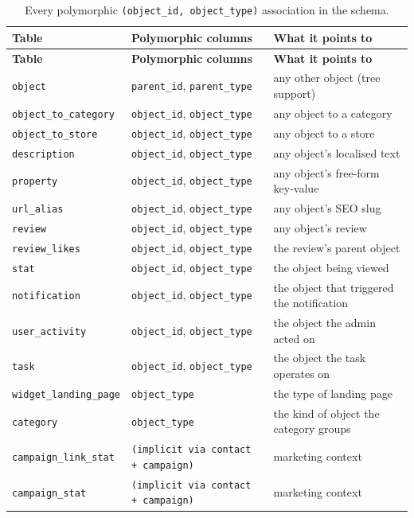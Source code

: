 \documentclass[11pt,a4paper]{article}
\begin{document}
\small
\begin{longtable}{>{\raggedright\arraybackslash}p{4.2cm}>{\raggedright\arraybackslash}p{4.4cm}>{\raggedright\arraybackslash}p{6.0cm}}
\caption{Every polymorphic \texttt{(object\_id, object\_type)} association in the schema.}\label{tab:polymorphic}\\
\toprule
\textbf{Table} & \textbf{Polymorphic columns} & \textbf{What it points to} \\
\midrule
\endfirsthead
\toprule
\textbf{Table} & \textbf{Polymorphic columns} & \textbf{What it points to} \\
\midrule
\endhead
\bottomrule
\endfoot
\texttt{object}                 & \texttt{parent\_id}, \texttt{parent\_type}             & any other object (tree support) \\
\texttt{object\_to\_category}   & \texttt{object\_id}, \texttt{object\_type}             & any object to a category \\
\texttt{object\_to\_store}      & \texttt{object\_id}, \texttt{object\_type}             & any object to a store \\
\texttt{description}            & \texttt{object\_id}, \texttt{object\_type}             & any object's localised text \\
\texttt{property}               & \texttt{object\_id}, \texttt{object\_type}             & any object's free-form key-value \\
\texttt{url\_alias}             & \texttt{object\_id}, \texttt{object\_type}             & any object's SEO slug \\
\texttt{review}                 & \texttt{object\_id}, \texttt{object\_type}             & any object's review \\
\texttt{review\_likes}          & \texttt{object\_id}, \texttt{object\_type}             & the review's parent object \\
\texttt{stat}                   & \texttt{object\_id}, \texttt{object\_type}             & the object being viewed \\
\texttt{notification}           & \texttt{object\_id}, \texttt{object\_type}             & the object that triggered the notification \\
\texttt{user\_activity}         & \texttt{object\_id}, \texttt{object\_type}             & the object the admin acted on \\
\texttt{task}                   & \texttt{object\_id}, \texttt{object\_type}             & the object the task operates on \\
\texttt{widget\_landing\_page}  & \texttt{object\_type}                                  & the type of landing page \\
\texttt{category}               & \texttt{object\_type}                                  & the kind of object the category groups \\
\texttt{campaign\_link\_stat}   & \texttt{(implicit via contact + campaign)}            & marketing context \\
\texttt{campaign\_stat}         & \texttt{(implicit via contact + campaign)}            & marketing context \\
\end{longtable}
\end{document}
